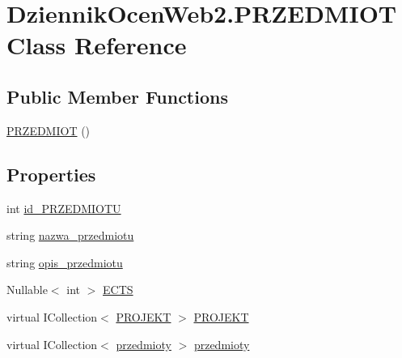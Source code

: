 \hypertarget{class_dziennik_ocen_web2_1_1_p_r_z_e_d_m_i_o_t}{}\section{Dziennik\+Ocen\+Web2.\+P\+R\+Z\+E\+D\+M\+I\+OT Class Reference}
\label{class_dziennik_ocen_web2_1_1_p_r_z_e_d_m_i_o_t}
\subsection*{Public Member Functions}
\begin{DoxyCompactItemize}
\item 
\hyperlink{class_dziennik_ocen_web2_1_1_p_r_z_e_d_m_i_o_t_a2b26163c62e451dcf97d0bc352f7853d}{P\+R\+Z\+E\+D\+M\+I\+OT} ()
\end{DoxyCompactItemize}
\subsection*{Properties}
\begin{DoxyCompactItemize}
\item 
int \hyperlink{class_dziennik_ocen_web2_1_1_p_r_z_e_d_m_i_o_t_aacf66c161f1a3e7450c080430c86a654}{id\+\_\+\+P\+R\+Z\+E\+D\+M\+I\+O\+TU}
\item 
string \hyperlink{class_dziennik_ocen_web2_1_1_p_r_z_e_d_m_i_o_t_a692205dfd7d2d26001ff5973d02d9b1d}{nazwa\+\_\+przedmiotu}
\item 
string \hyperlink{class_dziennik_ocen_web2_1_1_p_r_z_e_d_m_i_o_t_aeaee6acd4e2f2c30a9ae10d645c27919}{opis\+\_\+przedmiotu}
\item 
Nullable$<$ int $>$ \hyperlink{class_dziennik_ocen_web2_1_1_p_r_z_e_d_m_i_o_t_a0cafdd5372cf6098dcde7e456e547bc7}{E\+C\+TS}
\item 
virtual I\+Collection$<$ \hyperlink{class_dziennik_ocen_web2_1_1_p_r_o_j_e_k_t}{P\+R\+O\+J\+E\+KT} $>$ \hyperlink{class_dziennik_ocen_web2_1_1_p_r_z_e_d_m_i_o_t_ae5d3d8c92d85e32a0a23a31a0237e430}{P\+R\+O\+J\+E\+KT}
\item 
virtual I\+Collection$<$ \hyperlink{class_dziennik_ocen_web2_1_1przedmioty}{przedmioty} $>$ \hyperlink{class_dziennik_ocen_web2_1_1_p_r_z_e_d_m_i_o_t_a80f868563e700244e033a8a7ab2a48ee}{przedmioty}
\end{DoxyCompactItemize}


